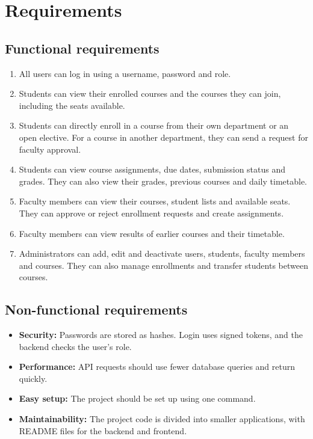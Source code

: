 \documentclass[11pt,a4paper]{article}
\begin{document}
\section{Requirements}

\subsection{Functional requirements}
\begin{enumerate}
    \item All users can log in using a username, password and role.
    \item Students can view their enrolled courses and the courses they can join,
    including the seats available.
    \item Students can directly enroll in a course from their own department or
    an open elective. For a course in another department, they can send a request
    for faculty approval.
    \item Students can view course assignments, due dates, submission status and
    grades. They can also view their grades, previous courses and daily timetable.
    \item Faculty members can view their courses, student lists and available
    seats. They can approve or reject enrollment requests and create assignments.
    \item Faculty members can view results of earlier courses and their timetable.
    \item Administrators can add, edit and deactivate users, students, faculty
    members and courses. They can also manage enrollments and transfer students
    between courses.
\end{enumerate}

\subsection{Non-functional requirements}
\begin{itemize}
    \item \textbf{Security:} Passwords are stored as hashes. Login uses signed
    tokens, and the backend checks the user's role.
    \item \textbf{Performance:} API requests should use fewer database queries
    and return quickly.
    \item \textbf{Easy setup:} The project should be set up using one command.
    \item \textbf{Maintainability:} The project code is divided into smaller
    applications, with README files for the backend and frontend.
\end{itemize}
\end{document}

